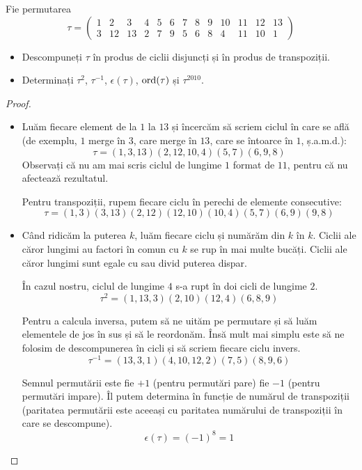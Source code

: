 \begin{exercise}
Fie permutarea
\[
\tau = \begin{pmatrix}
1 & 2 & 3 & 4 & 5 & 6 & 7 & 8 & 9 & 10 & 11 & 12 & 13 \\
3 & 12 & 13 & 2 & 7 & 9 & 5 & 6 & 8 & 4 & 11 & 10 & 1
\end{pmatrix}
\]
\begin{itemize}
    \item Descompuneți \(\tau\) în produs de ciclii disjuncți și în produs de transpoziții.
    \item Determinați \(\tau^2\), \(\tau^{-1}\), \(\epsilon(\tau)\), \(\operatorname{ord}(\tau)\) și \(\tau^{2010}\).
\end{itemize}
\end{exercise}
\begin{proof}
~
\begin{itemize}
    \item Luăm fiecare element de la \(1\) la \(13\) și încercăm să scriem ciclul în care se află (de exemplu, \(1\) merge în \(3\), care merge în \(13\), care se întoarce în \(1\), ș.a.m.d.):
    \[
        \tau = (1, 3, 13) (2, 12, 10, 4) (5, 7) (6, 9, 8)
    \]
    Observați că nu am mai scris ciclul de lungime \(1\) format de \(11\), pentru că nu afectează rezultatul.

    Pentru transpoziții, rupem fiecare ciclu în perechi de elemente consecutive:
    \[
        \tau = (1, 3) (3, 13) (2, 12) (12, 10) (10, 4) (5, 7) (6, 9) (9, 8)
    \]

    \item Când ridicăm la puterea \(k\), luăm fiecare ciclu și numărăm din \(k\) în \(k\). Ciclii ale căror lungimi au factori în comun cu \(k\) se rup în mai multe bucăți. Ciclii ale căror lungimi sunt egale cu sau divid puterea dispar.

    În cazul nostru, ciclul de lungime \(4\) s-a rupt în doi cicli de lungime \(2\).
    \[
        \tau^2 = (1, 13, 3) (2, 10) (12, 4) (6, 8, 9)
    \]

    Pentru a calcula inversa, putem să ne uităm pe permutare și să luăm elementele de jos în sus și să le reordonăm. Însă mult mai simplu este să ne folosim de descompunerea în cicli și să scriem fiecare ciclu invers.
    \[
        \tau^{-1} = (13, 3, 1) (4, 10, 12, 2) (7, 5) (8, 9, 6)
    \]

    Semnul permutării este fie \(+1\) (pentru permutări pare) fie \(-1\) (pentru permutări impare). Îl putem determina în funcție de numărul de transpoziții (paritatea permutării este aceeași cu paritatea numărului de transpoziții în care se descompune).
    \[
        \epsilon(\tau) = (-1)^{8} = 1
    \]


\end{itemize}
\end{proof}
